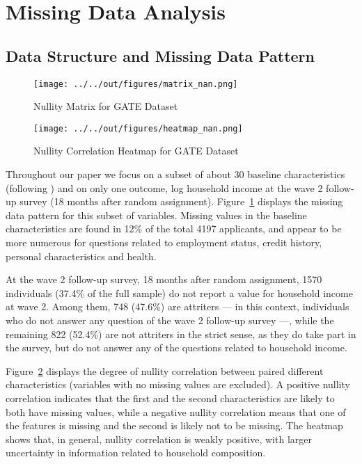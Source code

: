 
\section{Missing Data Analysis}

\subsection{Data Structure and Missing Data Pattern}

\begin{figure}[t]
    \caption{Nullity Matrix for GATE Dataset}
    \texttt{[image: ../../out/figures/matrix\_nan.png]}
    \label{fig:matrix_nan}
\end{figure}

\begin{figure}[t]
    \caption{Nullity Correlation Heatmap for GATE Dataset}
    \texttt{[image: ../../out/figures/heatmap\_nan.png]}
    \label{fig:heatmap_nan}
\end{figure}

Throughout our paper we focus on a subset of about 30 baseline characteristics (following \cite{fairlie2015behind}) and on only one outcome, log household income at the wave 2 follow-up survey (18 months after random assignment). Figure~\ref{fig:matrix_nan} displays the missing data pattern for this subset of variables. Missing values in the baseline characteristics are found in 12\% of the total 4197 applicants, and appear to be more numerous for questions related to employment status, credit history, personal characteristics and health.

At the wave 2 follow-up survey, 18 months after random assignment, 1570 individuals (37.4\% of the full sample) do not report a value for household income at wave 2. Among them, 748 (47.6\%) are attriters --- in this context, individuals who do not answer any question of the wave 2 follow-up survey ---, while the remaining 822 (52.4\%) are not attriters in the strict sense, as they do take part in the survey, but do not answer any of the questions related to household income.

Figure~\ref{fig:heatmap_nan} displays the degree of nullity correlation between paired different characteristics (variables with no missing values are excluded). A positive nullity correlation indicates that the first and the second characteristics are likely to both have missing values, while a negative nullity correlation means that one of the features is missing and the second is likely not to be missing. The heatmap shows that, in general, nullity correlation is weakly positive, with larger uncertainty in information related to household composition.

